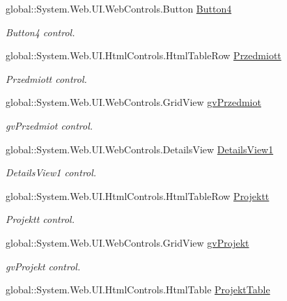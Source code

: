 \begin{DoxyCompactItemize}
global\+::\+System.\+Web.\+U\+I.\+Web\+Controls.\+Button \hyperlink{class_dziennik_ocen_web2_1_1_web_form1_aa4803d21f02860b91efc5823048e7ac4}{Button4}
\begin{DoxyCompactList}\small\item\em Button4 control. \end{DoxyCompactList}\item 
global\+::\+System.\+Web.\+U\+I.\+Html\+Controls.\+Html\+Table\+Row \hyperlink{class_dziennik_ocen_web2_1_1_web_form1_a5706de5be7075aed0566131920df6527}{Przedmiott}
\begin{DoxyCompactList}\small\item\em Przedmiott control. \end{DoxyCompactList}\item 
global\+::\+System.\+Web.\+U\+I.\+Web\+Controls.\+Grid\+View \hyperlink{class_dziennik_ocen_web2_1_1_web_form1_a33d6314fc2cc5c707fbc53f0ce93908e}{gv\+Przedmiot}
\begin{DoxyCompactList}\small\item\em gv\+Przedmiot control. \end{DoxyCompactList}\item 
global\+::\+System.\+Web.\+U\+I.\+Web\+Controls.\+Details\+View \hyperlink{class_dziennik_ocen_web2_1_1_web_form1_a1bae21a51b6446e066217e8a254a9cfc}{Details\+View1}
\begin{DoxyCompactList}\small\item\em Details\+View1 control. \end{DoxyCompactList}\item 
global\+::\+System.\+Web.\+U\+I.\+Html\+Controls.\+Html\+Table\+Row \hyperlink{class_dziennik_ocen_web2_1_1_web_form1_a6cf49628fc56b7e4e4078b13eef62dfd}{Projektt}
\begin{DoxyCompactList}\small\item\em Projektt control. \end{DoxyCompactList}\item 
global\+::\+System.\+Web.\+U\+I.\+Web\+Controls.\+Grid\+View \hyperlink{class_dziennik_ocen_web2_1_1_web_form1_ad32551b9a63fc02d922b608812673ccb}{gv\+Projekt}
\begin{DoxyCompactList}\small\item\em gv\+Projekt control. \end{DoxyCompactList}\item 
global\+::\+System.\+Web.\+U\+I.\+Html\+Controls.\+Html\+Table \hyperlink{class_dziennik_ocen_web2_1_1_web_form1_a3d1e1b225ea5a19d3331647f8f3a76ca}{Projekt\+Table}

\end{DoxyCompactItemize}

